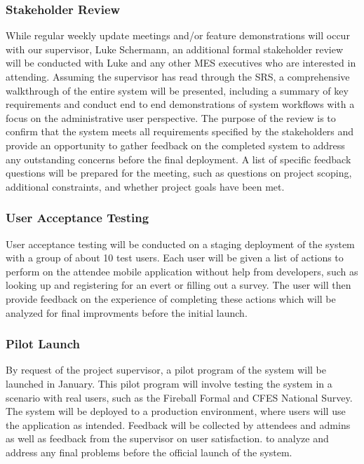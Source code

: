 \documentclass[12pt, titlepage]{article}
\begin{document}
\subsubsection{Stakeholder Review}
  While regular weekly update meetings and/or feature demonstrations will occur with our supervisor, Luke Schermann, an additional formal stakeholder review will be conducted with Luke and any other MES executives who are interested in attending. Assuming the supervisor has read through the SRS, a comprehensive walkthrough of the entire system will be presented, including a summary of key requirements and conduct end to end demonstrations of system workflows with a focus on the administrative user perspective. The purpose of the review is to confirm that the system meets all requirements specified by the stakeholders and provide an opportunity to gather feedback on the completed system to address any outstanding concerns before the final deployment. A list of specific feedback questions will be prepared for the meeting, such as questions on project scoping, additional constraints, and whether project goals have been met.
  
  \subsubsection{User Acceptance Testing}
  User acceptance testing will be conducted on a staging deployment of the system with a group of about 10 test users. Each user will be given a list of actions to perform on the attendee mobile application without help from developers, such as looking up and registering for an evert or filling out a survey. The user will then provide feedback on the experience of completing these actions which will be analyzed for final improvments before the initial launch.

\subsubsection{Pilot Launch}
  By request of the project supervisor, a pilot program of the system will be launched in January. This pilot program will involve testing the system in a scenario with real users, such as the Fireball Formal and CFES National Survey. The system will be deployed to a production environment, where users will use the application as intended. Feedback will be collected by attendees and admins as well as feedback from the supervisor on user satisfaction. to analyze and address any final problems before the official launch of the system.
\end{document}
